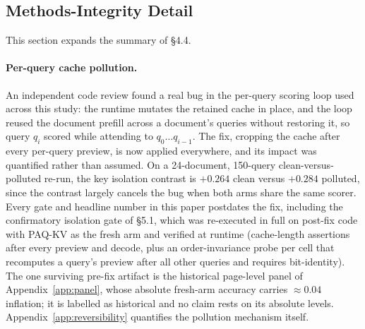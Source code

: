 \documentclass[letterpaper]{article} %
\newcommand{\paqc}{\textsc{PAQ-KV}}
\begin{document}
\subsection{Methods-Integrity Detail}\label{app:integrity}

This section expands the summary of \S4.4.

\paragraph{Per-query cache pollution.} An independent code review found a
real bug in the per-query scoring loop used across this study: the runtime
mutates the retained cache in place, and the loop reused the document prefill
across a document's queries without restoring it, so query $q_i$ scored while
attending to $q_0\ldots q_{i-1}$. The fix, cropping the cache after every
per-query preview, is now applied everywhere, and its impact was quantified
rather than assumed. On a 24-document, 150-query clean-versus-polluted
re-run, the key isolation contrast is $+0.264$ clean versus $+0.284$
polluted, since the contrast largely cancels the bug when both arms share the
same scorer. Every gate and headline number in this paper postdates the fix,
including the confirmatory isolation gate of \S5.1,
which was re-executed in full on post-fix code with \paqc{} as the fresh arm
and verified at runtime (cache-length assertions after every preview and
decode, plus an order-invariance probe per cell that recomputes a query's
preview after all other queries and requires bit-identity). The one
surviving pre-fix artifact is the historical page-level panel of
Appendix~\ref{app:panel}, whose absolute fresh-arm accuracy carries
${\approx}0.04$ inflation; it is labelled as historical and no claim rests
on its absolute levels. Appendix~\ref{app:reversibility} quantifies the
pollution mechanism itself.
\end{document}
